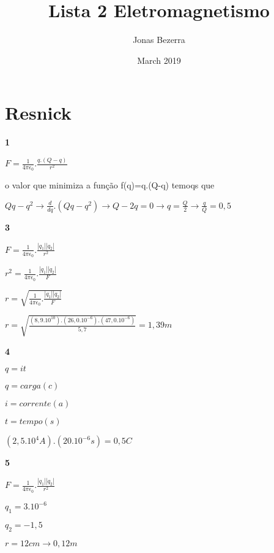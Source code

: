\documentclass{article}
\title{Lista 2 Eletromagnetismo}
\author{Jonas Bezerra}
\date{March 2019}
\begin{document}
\maketitle

\section{Resnick}

\textbf{1}

$F=\frac{1}{4\pi \epsilon _0}. \frac{q.(Q-q)}{r^2}$

o valor que minimiza a função f(q)=q.(Q-q) temoqs que 

$Qq-q^2 \rightarrow \frac{d}{dq}.(Qq-q^2) \rightarrow Q-2q=0 \rightarrow q=\frac{Q}{2}\rightarrow \frac{q}{Q}=0,5 $\newline

\textbf{3}

$F=\frac{1}{4\pi \epsilon _0}. \frac{|q_1| |q_2|}{r^2}$\newline

$r^2=\frac{1}{4\pi \epsilon _0}. \frac{|q_1| |q_2|}{F} $\newline

$r=\sqrt{ \frac{1}{4\pi \epsilon _0}. \frac{|q_1| |q_2|}{F}}$\newline

$r=\sqrt{\frac{(8,9.10^{10}).(26,0.10^{-6}).(47,0.10^{-6})}{5,7}} = 1,39 m$\newline

\textbf{4}

$q= it$\newline

$q=carga(c)$\newline

$i=corrente(a)$\newline

$t=tempo(s)$\newline

$(2,5.10^{4}A).(20.10^{-6}s)=0,5 C$\newline

\textbf{5}

$F=\frac{1}{4\pi \epsilon _0}. \frac{|q_1| |q_2|}{r^2}$\newline

$q_1 = 3.10^{-6}$\newline

$q_2 = -1,5$\newline

$r = 12 cm \rightarrow 0,12m$\newline
\end{document}
